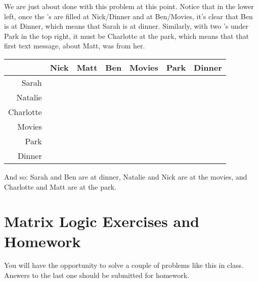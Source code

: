 We are just about done with this problem at this point.  Notice that in the lower left, once the \mX{}'s are filled at Nick/Dinner and at Ben/Movies, it's clear that Ben is at Dinner, which means that Sarah is at dinner.  Similarly, with two \mX{}'s under Park in the top right, it must be Charlotte at the park, which means that that first text message, about Matt, was from her.

\begin{tcolorbox}[width=\textwidth,colback=black!10]
    \begin{center}
        \begin{tabular}{r|c|c|c||c|c|c|}
            & Nick & Matt & Ben & Movies & Park & Dinner\\
            \hline\hline
            Sarah & \mX{} & \mX{} & \mO{} & \mX{} & \mX{} & \mO{} \\
            \hline
            Natalie & \mO{} & \mX{} & \mX{} & \mO{} & \mX{} & \mX{} \\
            \hline
            Charlotte & \mX{} & \mO{} & \mX{} & \mX{} & \mO{} & \mX{} \\
            \hline\hline
            Movies & \mO{} & \mX{} & \mX{} \\
            \cline{1-4}
            Park & \mX{} & \mO{} & \mX{} \\
            \cline{1-4}
            Dinner & \mX{} & \mX{} & \mO{} \\
            \cline{1-4}
        \end{tabular}
    \end{center}
\end{tcolorbox}

And so: Sarah and Ben are at dinner, Natalie and Nick are at the movies, and Charlotte and Matt are at the park.

\section{Matrix Logic Exercises and Homework}

You will have the opportunity to solve a couple of problems like this in class.  Answers to the last one should be submitted for homework.